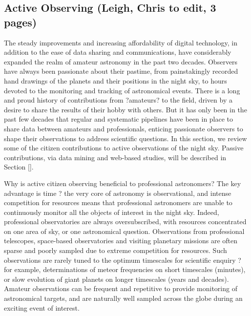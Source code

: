 \documentclass{ar2e}
\begin{document}

\subsection{Active Observing (\textbf{Leigh}, Chris to edit, 3 pages)}
\label{sec:obs:active}

The steady improvements and increasing affordability of digital technology, in
addition to the ease of data sharing and communications, have considerably
expanded the realm of amateur astronomy in the past two decades.  Observers
have always been passionate about their pastime, from painstakingly recorded
hand drawings of the planets and their positions in the night sky, to hours
devoted to the monitoring and tracking of astronomical events.  There is a
long and proud history of contributions from ?amateurs? to the field, driven
by a desire to share the results of their hobby with others.  But it has only
been in the past few decades that regular and systematic pipelines have been
in place to share data between amateurs and professionals, enticing passionate
observers to shape their observations to address scientific questions.  In
this section, we review some of the citizen contributions to active
observations of the night sky.  Passive contributions, via data mining and
web-based studies, will be described in Section \ref{}.

Why is active citizen observing beneficial to professional astronomers?  The
key advantage is time ? the very core of astronomy is observational, and
intense competition for resources means that professional astronomers are
unable to continuously monitor all the objects of interest in the night sky. 
Indeed, professional observatories are always oversubscribed, with resources
concentrated on one area of sky, or one astronomical question.  Observations
from professional telescopes, space-based observatories and visiting planetary
missions are often sparse and poorly sampled due to extreme competition for
resources.  Such observations are rarely tuned to the optimum timescales for
scientific enquiry ? for example, determinations of meteor frequencies on
short timescales (minutes), or slow evolution of giant planets on longer
timescales (years and decades).  Amateur observations can be frequent and
repetitive to provide monitoring of astronomical targets, and are naturally
well sampled across the globe during an exciting event of interest. 
\end{document}

